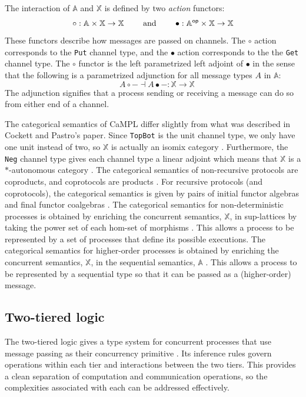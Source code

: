 \documentclass[acmsmall]{acmart}
\begin{document}
The interaction of $\mathbb{A}$ and $\mathbb{X}$ is defined by two {\em action} functors:
\[ \circ: \mathbb{A} \times \mathbb{X} \to \mathbb{X} \quad \quad \text{ and } \quad \quad \bullet: \mathbb{A}^{\sf op} \times \mathbb{X} \to \mathbb{X}\]
These functors describe how messages are passed on channels.
The \(\circ\) action corresponds to the \lstinline{Put} channel type, and the \(\bullet\) action corresponds to the the \lstinline{Get} channel type.
The $\circ$ functor is the left parametrized left adjoint of $\bullet$ in the sense that the following is a parametrized adjunction for all message types \(A\) in \(\mathbb{A}\):
\[ \quad A \circ - \dashv A \bullet - : \mathbb{X} \to \mathbb{X} \]
The adjunction signifies that a process sending or receiving a message can do so from either end of a channel. 

The categorical semantics of CaMPL differ slightly from what was described in Cockett and Pastro’s paper.
Since \lstinline{TopBot} is the unit channel type, we only have one unit instead of two, so $\mathbb{X}$ is actually an isomix category \cite{CS97a}.
Furthermore, the \lstinline{Neg} channel type gives each channel type a linear adjoint which means that  $\mathbb{X}$ is a $\ast$-autonomous category \cite{barr}.
The categorical semantics of non-recursive protocols are coproducts, and coprotocols are products \cite{CoS01, CoP04}.
For recursive protocols (and coprotocols), the categorical semantics is given by pairs of initial functor algebras and final functor coalgebras \cite{Ye12}.
The categorical semantics for non-deterministic processes is obtained by enriching the concurrent semantics, $\mathbb{X}$, in sup-lattices by taking the power set of each hom-set of morphisms \cite{xanna}.
This allows a process to be represented by a set of processes that define its possible executions.
The categorical semantics for higher-order processes is obtained by enriching the concurrent semantics, $\mathbb{X}$, in the sequential semantics, $\mathbb{A}$ \cite{No25}.
This allows a process to be represented by a sequential type so that it can be passed as a (higher-order) message.

\subsection{Two-tiered logic}

The two-tiered logic gives a type system for concurrent processes that use message passing as their concurrency primitive \cite{CoP07}. 
Its inference rules govern operations within each tier and interactions between the two tiers. 
This provides a clean separation of computation and communication operations, so the complexities associated with each can be addressed effectively.
\end{document}

